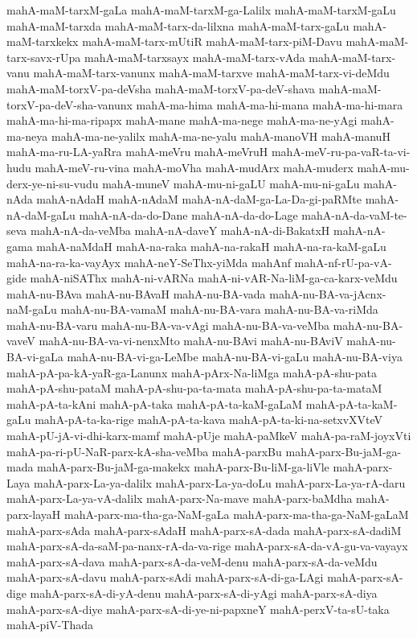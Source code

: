 {mahA-maM-tarxM-gaLa
mahA-maM-tarxM-ga-Lalilx
mahA-maM-tarxM-gaLu
mahA-maM-tarxda
mahA-maM-tarx-da-lilxna
mahA-maM-tarx-gaLu
mahA-maM-tarxkekx
mahA-maM-tarx-mUtiR
mahA-maM-tarx-piM-Davu
mahA-maM-tarx-savx-rUpa
mahA-maM-tarxsayx
mahA-maM-tarx-vAda
mahA-maM-tarx-vanu
mahA-maM-tarx-vanunx
mahA-maM-tarxve
mahA-maM-tarx-vi-deMdu
mahA-maM-torxV-pa-deVsha
mahA-maM-torxV-pa-deV-shava
mahA-maM-torxV-pa-deV-sha-vanunx
mahA-ma-hima
mahA-ma-hi-mana
mahA-ma-hi-mara
mahA-ma-hi-ma-ripapx
mahA-mane
mahA-ma-nege
mahA-ma-ne-yAgi
mahA-ma-neya
mahA-ma-ne-yalilx
mahA-ma-ne-yalu
mahA-manoVH
mahA-manuH
mahA-ma-ru-LA-yaRra
mahA-meVru
mahA-meVruH
mahA-meV-ru-pa-vaR-ta-vi-hudu
mahA-meV-ru-vina
mahA-moVha
mahA-mudArx
mahA-muderx
mahA-mu-derx-ye-ni-su-vudu
mahA-muneV
mahA-mu-ni-gaLU
mahA-mu-ni-gaLu
mahA-nAda
mahA-nAdaH
mahA-nAdaM
mahA-nA-daM-ga-La-Da-gi-paRMte
mahA-nA-daM-gaLu
mahA-nA-da-do-Dane
mahA-nA-da-do-Lage
mahA-nA-da-vaM-te-seva
mahA-nA-da-veMba
mahA-nA-daveY
mahA-nA-di-BakatxH
mahA-nA-gama
mahA-naMdaH
mahA-na-raka
mahA-na-rakaH
mahA-na-ra-kaM-gaLu
mahA-na-ra-ka-vayAyx
mahA-neY-SeThx-yiMda
mahAnf
mahA-nf-rU-pa-vA-gide
mahA-niSAThx
mahA-ni-vARNa
mahA-ni-vAR-Na-liM-ga-ca-karx-veMdu
mahA-nu-BAva
mahA-nu-BAvaH
mahA-nu-BA-vada
mahA-nu-BA-va-jAcnx-naM-gaLu
mahA-nu-BA-vamaM
mahA-nu-BA-vara
mahA-nu-BA-va-riMda
mahA-nu-BA-varu
mahA-nu-BA-va-vAgi
mahA-nu-BA-va-veMba
mahA-nu-BA-vaveV
mahA-nu-BA-va-vi-nenxMto
mahA-nu-BAvi
mahA-nu-BAviV
mahA-nu-BA-vi-gaLa
mahA-nu-BA-vi-ga-LeMbe
mahA-nu-BA-vi-gaLu
mahA-nu-BA-viya
mahA-pA-pa-kA-yaR-ga-Lanunx
mahA-pArx-Na-liMga
mahA-pA-shu-pata
mahA-pA-shu-pataM
mahA-pA-shu-pa-ta-mata
mahA-pA-shu-pa-ta-mataM
mahA-pA-ta-kAni
mahA-pA-taka
mahA-pA-ta-kaM-gaLaM
mahA-pA-ta-kaM-gaLu
mahA-pA-ta-ka-rige
mahA-pA-ta-kava
mahA-pA-ta-ki-na-setxvXVteV
mahA-pU-jA-vi-dhi-karx-mamf
mahA-pUje
mahA-paMkeV
mahA-pa-raM-joyxVti
mahA-pa-ri-pU-NaR-parx-kA-sha-veMba
mahA-parxBu
mahA-parx-Bu-jaM-ga-mada
mahA-parx-Bu-jaM-ga-makekx
mahA-parx-Bu-liM-ga-liVle
mahA-parx-Laya
mahA-parx-La-ya-dalilx
mahA-parx-La-ya-doLu
mahA-parx-La-ya-rA-daru
mahA-parx-La-ya-vA-dalilx
mahA-parx-Na-mave
mahA-parx-baMdha
mahA-parx-layaH
mahA-parx-ma-tha-ga-NaM-gaLa
mahA-parx-ma-tha-ga-NaM-gaLaM
mahA-parx-sAda
mahA-parx-sAdaH
mahA-parx-sA-dada
mahA-parx-sA-dadiM
mahA-parx-sA-da-saM-pa-nanx-rA-da-va-rige
mahA-parx-sA-da-vA-gu-va-vayayx
mahA-parx-sA-dava
mahA-parx-sA-da-veM-denu
mahA-parx-sA-da-veMdu
mahA-parx-sA-davu
mahA-parx-sAdi
mahA-parx-sA-di-ga-LAgi
mahA-parx-sA-dige
mahA-parx-sA-di-yA-denu
mahA-parx-sA-di-yAgi
mahA-parx-sA-diya
mahA-parx-sA-diye
mahA-parx-sA-di-ye-ni-papxneY
mahA-perxV-ta-sU-taka
mahA-piV-Thada
}

